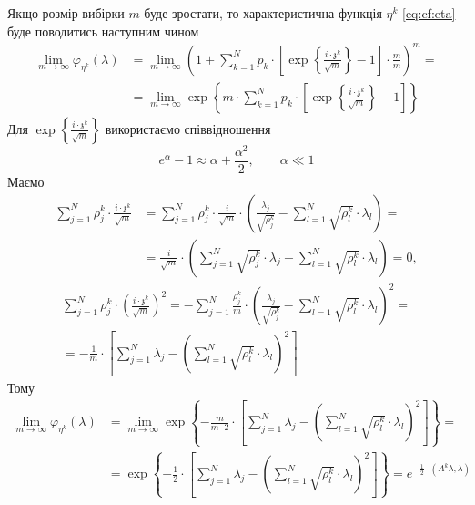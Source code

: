 Якщо розмір вибірки $m$ буде зростати, то характеристична функція $\eta^k$
\eqref{eq:cf:eta} буде поводитись наступним чином
\begin{equation*}
  \begin{split}
    \lim_{m \to \infty} \varphi_{\eta^k}\left( \lambda \right)
    &= \lim_{m \to \infty} \left( 1 + \sum_{k=1}^{N} p_k \cdot \left[
      \exp{\left\{ \frac{i \cdot \mathfrak{z}^k}{\sqrt{m}} \right\}}
      - 1 \right] \cdot \frac{m}{m} \right)^m = \\
    &= \lim_{m \to \infty} \exp{ \left\{ m \cdot \sum_{k=1}^{N} p_k \cdot \left[
      \exp{\left\{ \frac{i \cdot \mathfrak{z}^k}{\sqrt{m}} \right\}}
      - 1 \right] \right\}}
  \end{split}
\end{equation*}
Для $\exp{\left\{ \frac{i \cdot \mathfrak{z}^k}{\sqrt{m}} \right\}}$
використаємо співвідношення
\begin{equation*}
  e^{\alpha} - 1 \approx \alpha + \frac{\alpha^2}{2},\qquad \alpha \ll 1
\end{equation*}
Маємо
\begin{equation*}
  \begin{split}
    \sum_{j=1}^{N} \rho_j^k \cdot \frac{i \cdot \mathfrak{z}^k}{\sqrt{m}}
    &= \sum_{j=1}^{N} \rho_j^k \cdot \frac{i}{\sqrt{m}}
      \cdot \left( \frac{\lambda_j}{\sqrt{\rho_j^k}}
        - \sum_{l=1}^{N} \sqrt{\rho_l^k} \cdot \lambda_l \right) = \\
    &= \frac{i}{\sqrt{m}} \cdot \left(
      \sum_{j=1}^{N} \sqrt{\rho_j^k} \cdot \lambda_j
      - \sum_{l=1}^{N} \sqrt{\rho_l^k} \cdot \lambda_l \right)
    = 0,
  \end{split}
\end{equation*}
\begin{equation*}
  \begin{split}
    \sum_{j=1}^{N} \rho_j^k
      \cdot \left( \frac{i \cdot \mathfrak{z}^k}{\sqrt{m}} \right)^2
      = - \sum_{j=1}^{N} \frac{\rho_j^k}{m}
        \cdot \left( \frac{\lambda_j}{\sqrt{\rho_j^k}}
          - \sum_{l=1}^{N} \sqrt{\rho_l^k} \cdot \lambda_l \right)^2 = \\
      = - \frac{1}{m} \cdot \left[ \sum_{j=1}^{N} \lambda_j
        - \left( \sum_{l=1}^{N} \sqrt{\rho_l^k} \cdot \lambda_l \right)^2
          \right]
  \end{split}
\end{equation*}
Тому
\begin{equation*}
  \begin{split}
    \lim_{m \to \infty} \varphi_{\eta^k}\left( \lambda \right)
    &= \lim_{m \to \infty} \exp{\left\{ -\frac{m}{m \cdot 2}
      \cdot \left[ \sum_{j=1}^{N} \lambda_j
        - \left( \sum_{l=1}^{N} \sqrt{\rho_l^k} \cdot \lambda_l \right)^2
        \right]\right\}} = \\
    &= \exp{\left\{ -\frac{1}{2} \cdot
      \left[ \sum_{j=1}^{N} \lambda_j
        - \left( \sum_{l=1}^{N} \sqrt{\rho_l^k} \cdot \lambda_l \right)^2
        \right] \right\}}
    = e^{-\frac{1}{2} \cdot \left( A^k \lambda, \lambda \right)}
  \end{split}
\end{equation*}
